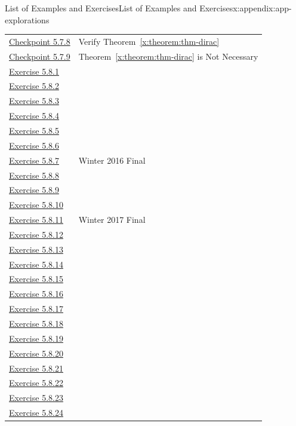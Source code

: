 \documentclass[oneside,10pt,]{book}
\newcommand{\xreffont}{\relax}
\numberwithin{equation}{section}
\begin{document}
\begin{appendixptx}{List of Examples and Exercises}{}{List of Examples and Exercises}{}{}{x:appendix:app-explorations}
\begin{longtable}[l]{ll}
\hyperref[x:exercise:ex-verify-dirac]{Checkpoint 5.7.8}& Verify Theorem~{\xreffont\ref*{x:theorem:thm-dirac}}\\
\hyperref[x:exercise:ex-hamiltonian-necessary]{Checkpoint 5.7.9}& Theorem~{\xreffont\ref*{x:theorem:thm-dirac}} is Not Necessary\\
\hyperlink{g:exercise:id548410}{Exercise 5.8.1}& \\
\hyperlink{g:exercise:id548409}{Exercise 5.8.2}& \\
\hyperlink{g:exercise:id548443}{Exercise 5.8.3}& \\
\hyperlink{g:exercise:id548426}{Exercise 5.8.4}& \\
\hyperlink{g:exercise:id548486}{Exercise 5.8.5}& \\
\hyperlink{g:exercise:id548469}{Exercise 5.8.6}& \\
\hyperlink{g:exercise:id548493}{Exercise 5.8.7}& Winter 2016 Final\\
\hyperlink{g:exercise:id548525}{Exercise 5.8.8}& \\
\hyperlink{g:exercise:id548494}{Exercise 5.8.9}& \\
\hyperlink{g:exercise:id548528}{Exercise 5.8.10}& \\
\hyperlink{g:exercise:id548535}{Exercise 5.8.11}& Winter 2017 Final\\
\hyperlink{g:exercise:id548554}{Exercise 5.8.12}& \\
\hyperlink{g:exercise:id548577}{Exercise 5.8.13}& \\
\hyperlink{g:exercise:id548641}{Exercise 5.8.14}& \\
\hyperlink{g:exercise:id548614}{Exercise 5.8.15}& \\
\hyperlink{g:exercise:id548623}{Exercise 5.8.16}& \\
\hyperlink{x:exercise:ex-any-isomorphic}{Exercise 5.8.17}& \\
\hyperlink{x:exercise:ex-complement-deg-sequence}{Exercise 5.8.18}& \\
\hyperlink{g:exercise:id549430}{Exercise 5.8.19}& \\
\hyperlink{g:exercise:id549449}{Exercise 5.8.20}& \\
\hyperlink{g:exercise:id549444}{Exercise 5.8.21}& \\
\hyperlink{g:exercise:id549443}{Exercise 5.8.22}& \\
\hyperlink{x:exercise:ex-path-transitive}{Exercise 5.8.23}& \\
\hyperlink{x:exercise:ex-connectedness-relation}{Exercise 5.8.24}& \\

\end{longtable}
\end{appendixptx}
\end{document}
